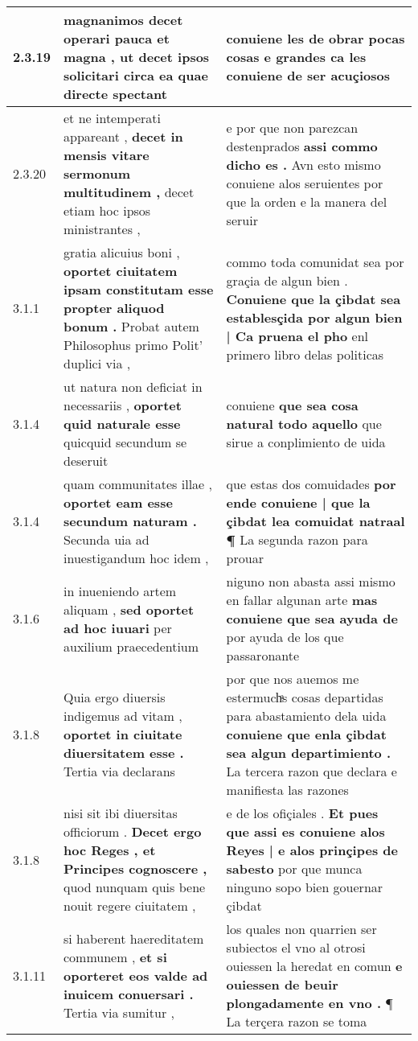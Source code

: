 \begin{tabular}{|p{1cm}|p{6.5cm}|p{6.5cm}|}
2.3.19 & magnanimos decet operari pauca et magna , \textbf{ ut decet ipsos solicitari } circa ea quae directe spectant & conuiene les de obrar pocas cosas \textbf{ e grandes ca les conuiene } de ser acuçiosos \\\hline
2.3.20 & et ne intemperati appareant , \textbf{ decet in mensis vitare sermonum multitudinem , } decet etiam hoc ipsos ministrantes , & e por que non parezcan destenprados \textbf{ assi commo dicho es . } Avn esto mismo conuiene alos seruientes por que la orden e la manera del seruir \\\hline
3.1.1 & gratia alicuius boni , \textbf{ oportet ciuitatem ipsam constitutam esse propter aliquod bonum . } Probat autem Philosophus primo Polit’ duplici via , & commo toda comunidat sea por graçia de algun bien . \textbf{ Conuiene que la çibdat sea establesçida por algun bien | Ca pruena el pho } enl primero libro delas politicas \\\hline
3.1.4 & ut natura non deficiat in necessariis , \textbf{ oportet quid naturale esse } quicquid secundum se deseruit & conuiene \textbf{ que sea cosa natural todo aquello } que sirue a conplimiento de uida \\\hline
3.1.4 & quam communitates illae , \textbf{ oportet eam esse secundum naturam . } Secunda uia ad inuestigandum hoc idem , & que estas dos comuidades \textbf{ por ende conuiene | que la çibdat lea comuidat natraal ¶ } La segunda razon para prouar \\\hline
3.1.6 & in inueniendo artem aliquam , \textbf{ sed oportet ad hoc iuuari } per auxilium praecedentium & niguno non abasta assi mismo en fallar algunan arte \textbf{ mas conuiene que sea ayuda de } por ayuda de los que passaronante \\\hline
3.1.8 & Quia ergo diuersis indigemus ad vitam , \textbf{ oportet in ciuitate diuersitatem esse . } Tertia via declarans & por que nos auemos me estermuchͣs cosas departidas para abastamiento dela uida \textbf{ conuiene que enla çibdat sea algun departimiento . } La tercera razon que declara e manifiesta las razones \\\hline
3.1.8 & nisi sit ibi diuersitas officiorum . \textbf{ Decet ergo hoc Reges , et Principes cognoscere , } quod nunquam quis bene nouit regere ciuitatem , & e de los ofiçiales . \textbf{ Et pues que assi es conuiene alos Reyes | e alos prinçipes de sabesto } por que munca ninguno sopo bien gouernar çibdat \\\hline
3.1.11 & si haberent haereditatem communem , \textbf{ et si oporteret eos valde ad inuicem conuersari . } Tertia via sumitur , & los quales non quarrien ser subiectos el vno al otrosi ouiessen la heredat en comun \textbf{ e ouiessen de beuir plongadamente en vno . } ¶ La terçera razon se toma \\\hline

\end{tabular}
